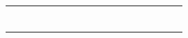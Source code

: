 \documentclass[a4paper,11pt]{report}
\begin{document}
\begin{center}
\begin{tabular}{|c|c|c|c|c|c|c|c|c|c|c|c||c|c|c|c|c|c|}
\hline
  &  &  &  &  &  &  &   &   &   &    &  &  &  &  &  &  &  \\
\hline
  &  &  &  &  &  &  &   &   &   &    &  &  &  &  &  &  &  \\
\hline
  &  &  &  &  &  &  &   &   &   &    &  &  &  &  &  &  &  \\
\hline
  &  &  &  &  &  &  &   &   &   &    &  &  &  &  &  &  &  \\
\hline
  &  &  &  &  &  &  &   &   &   &    &  &  &  &  &  &  &  \\
\hline
  &  &  &  &  &  &  &   &   &   &    &  &  &  &  &  &  &  \\
\hline
  &  &  &  &  &  &  &   &   &   &    &  &  &  &  &  &  &  \\
\hline
  &  &  &  &  &  &  &   &   &   &    &  &  &  &  &  &  &  \\
\hline


\end{tabular}
\end{center}

\newpage
\end{document}
